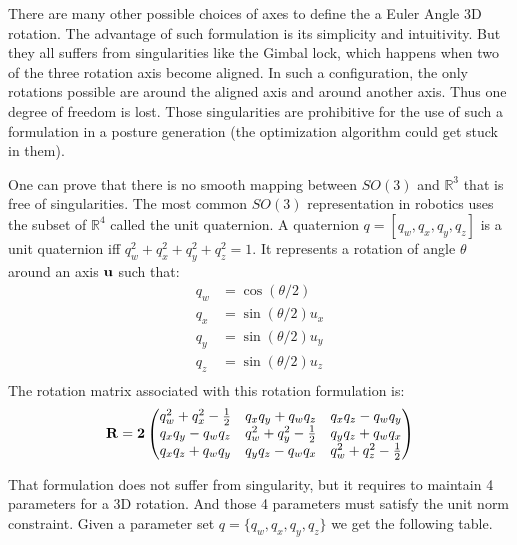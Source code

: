 There are many other possible choices of axes to define the a Euler Angle 3D rotation.
The advantage of such formulation is its simplicity and intuitivity.
But they all suffers from singularities like the Gimbal lock, which happens when two of the three rotation axis become aligned.
In such a configuration, the only rotations possible are around the aligned axis and around another axis.
Thus one degree of freedom is lost.
Those singularities are prohibitive for the use of such a formulation in a posture generation (the optimization algorithm could get stuck in them).

One can prove that there is no smooth mapping between $SO(3)$ and $\mathbb{R}^3$ that is free of singularities.
The most common $SO(3)$ representation in robotics uses the subset of $\mathbb{R}^4$ called the unit quaternion.
A quaternion $q = [q_w, q_x, q_y, q_z]$ is a unit quaternion iff $q_w^2+q_x^2+q_y^2+q_z^2 = 1$.
It represents a rotation of angle $\theta$ around an axis $\bf{u}$ such that:
\begin{align}
  q_w &= \cos(\theta/2) \\
  q_x &= \sin(\theta/2)u_x \\
  q_y &= \sin(\theta/2)u_y \\
  q_z &= \sin(\theta/2)u_z \\
\end{align}
The rotation matrix associated with this rotation formulation is:
\begin{equation}
  \bf{R} = 2 \begin{pmatrix}
    q_w^2 +q_x^2-\frac{1}{2} & q_x q_y + q_w q_z & q_x q_z - q_w q_y \\
    q_x q_y - q_w q_z & q_w^2 +q_y^2-\frac{1}{2} & q_y q_z + q_w q_x \\
    q_x q_z + q_w q_y & q_y q_z - q_w q_x & q_w^2 +q_z^2-\frac{1}{2} \\
  \end{pmatrix}
\end{equation}

That formulation does not suffer from singularity, but it requires to maintain 4 parameters for a 3D rotation. And those 4 parameters must satisfy the unit norm constraint.
Given a parameter set $q = \{ q_w, q_x, q_y, q_z\}$ we get the following table.

